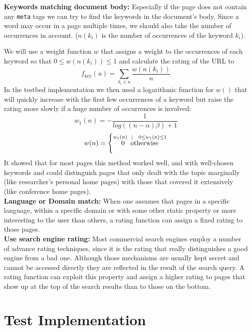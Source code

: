 \documentclass[a4paper]{danarticle}
\theoremstyle{remark}
\begin{document}
    \textbf{Keywords matching document body:} Especially if the page does not
    contain any \verb$meta$ tags we can try to find the keywords in the
    document's body. Since a word may occur in a page multiple times, we should
    also take the number of occurrences in account. ($ n(k_i) $ is the number of
    occurrences of the keyword $ k_i $).
    
    We will use a weight function $ w $ that assigns a weight to the occurrences
    of each keyword so that $ 0 \leq w(n(k_i)) \leq 1 $ and calculate the
    rating of the URL to
    \[
      f_{\mbox{key}}(u) = \sum_{k_i \in u} \frac{w(n(k_i))}{n}
    \]
    In the testbed implementation we then used a logarithmic function for 
    $w()$ that will quickly increase with the first few occurrences of a 
    keyword but raise the rating more slowly if a huge number of occurrences is 
    involved:
    \[
      w_1(n) = - \frac{1}{log((n - \alpha) \beta) + 1}
    \]
    \[
      w(n) = \left\{
      \stackrel{w_1(n) \hspace{2mm} | \hspace{3mm} 0 \leq w_1(n) \leq 1}
      {0 \hspace{3mm} \mbox{otherwise}}
      \right.
    \]
    It showed that for most pages this method worked well, and with well-chosen 
    keywords and could distinguish pages that only dealt with the topic 
    marginally (like researcher's personal home pages) with those that covered 
    it extensively (like conference home pages).
    \\
    
    \textbf{Language or Domain match:} When one assumes that pages in a specific 
    language, within a specific domain or with some other static property or 
    more interesting to the user than others, a rating function can assign a 
    fixed rating to those pages.
    \\
    
    \textbf{Use search engine rating:} Most commercial search engines employ a 
    number of advance rating techniques, since it is the rating that really 
    distinguishes a good engine from a bad one. Although those mechanisms are 
    usually kept secret and cannot be accessed directly they are reflected in 
    the result of the search query. A rating function can exploit this property 
    and assign a higher rating to pages that show up at the top of the search 
    results than to those on the bottom.
  \section{Test Implementation}
\end{document}
